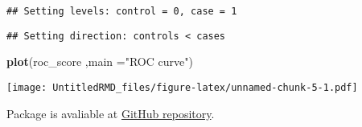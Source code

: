 \documentclass[
]{article}
\newenvironment{Shaded}{\begin{snugshade}}{\end{snugshade}}
\newcommand{\AttributeTok}[1]{\textcolor[rgb]{0.13,0.29,0.53}{#1}}
\newcommand{\FunctionTok}[1]{\textcolor[rgb]{0.13,0.29,0.53}{\textbf{#1}}}
\newcommand{\NormalTok}[1]{#1}
\newcommand{\StringTok}[1]{\textcolor[rgb]{0.31,0.60,0.02}{#1}}
\begin{document}
\begin{verbatim}
## Setting levels: control = 0, case = 1
\end{verbatim}

\begin{verbatim}
## Setting direction: controls < cases
\end{verbatim}

\begin{Shaded}
\begin{Highlighting}[]
\FunctionTok{plot}\NormalTok{(roc\_score ,}\AttributeTok{main =}\StringTok{"ROC curve"}\NormalTok{)}
\end{Highlighting}
\end{Shaded}

\texttt{[image: UntitledRMD\_files/figure-latex/unnamed-chunk-5-1.pdf]}

Package is avaliable at
\href{https://github.com/Oichii/ClassificationMetricsR}{GitHub
repository}.
\end{document}
